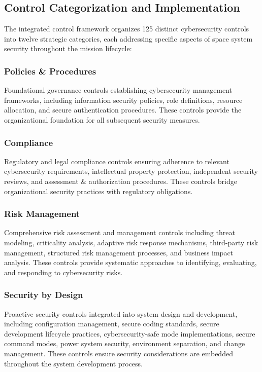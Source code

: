 \documentclass[binding=0.6cm]{sapthesis}
\begin{document}
\subsection{Control Categorization and Implementation}

The integrated control framework organizes 125 distinct cybersecurity controls into twelve strategic categories, each addressing specific aspects of space system security throughout the mission lifecycle:

\subsubsection{Policies \& Procedures}
Foundational governance controls establishing cybersecurity management frameworks, including information security policies, role definitions, resource allocation, and secure authentication procedures. These controls provide the organizational foundation for all subsequent security measures.

\subsubsection{Compliance}
Regulatory and legal compliance controls ensuring adherence to relevant cybersecurity requirements, intellectual property protection, independent security reviews, and assessment \& authorization procedures. These controls bridge organizational security practices with regulatory obligations.

\subsubsection{Risk Management}
Comprehensive risk assessment and management controls including threat modeling, criticality analysis, adaptive risk response mechanisms, third-party risk management, structured risk management processes, and business impact analysis. These controls provide systematic approaches to identifying, evaluating, and responding to cybersecurity risks.

\subsubsection{Security by Design}
Proactive security controls integrated into system design and development, including configuration management, secure coding standards, secure development lifecycle practices, cybersecurity-safe mode implementations, secure command modes, power system security, environment separation, and change management. These controls ensure security considerations are embedded throughout the system development process.
\end{document}
